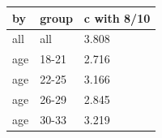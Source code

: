 \begingroup\small
\setlength{\tabcolsep}{3pt}
\renewcommand{\arraystretch}{1.04}
\begin{tabularx}{\linewidth}{XXX}
\toprule
by & group & c with 8/10 \\
\midrule
all & all & 3.808 \\
age & 18-21 & 2.716 \\
age & 22-25 & 3.166 \\
age & 26-29 & 2.845 \\
age & 30-33 & 3.219 \\
\bottomrule
\end{tabularx}
\endgroup
